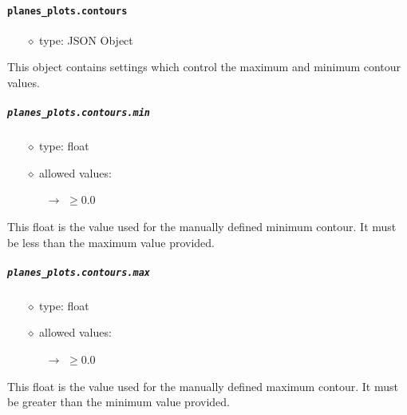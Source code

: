 \documentclass[]{article}
\def\code#1{\texttt{#1}}
\begin{document}
\paragraph{\code{planes\_plots.contours}}\label{sec:numcontour}
\begin{itemize}
    \item[$\diamond$] type: JSON Object 
\end{itemize}
This object contains settings which control the maximum and minimum contour
values.

\subparagraph{\code{planes\_plots.contours.min}}
\begin{itemize}
    \item[$\diamond$] type: float 
    \item[$\diamond$] allowed values:
    \begin{itemize}
        \item[$\rightarrow$] $\geq0.0$
    \end{itemize}
\end{itemize}
This float is the value used for the manually defined minimum contour. It must
be less than the maximum value provided.

\subparagraph{\code{planes\_plots.contours.max}}
\begin{itemize}
    \item[$\diamond$] type: float 
    \item[$\diamond$] allowed values:
    \begin{itemize}
        \item[$\rightarrow$] $\geq0.0$
    \end{itemize}
\end{itemize}
This float is the value used for the manually defined maximum contour. It must
be greater than the minimum value provided.
\end{document}
